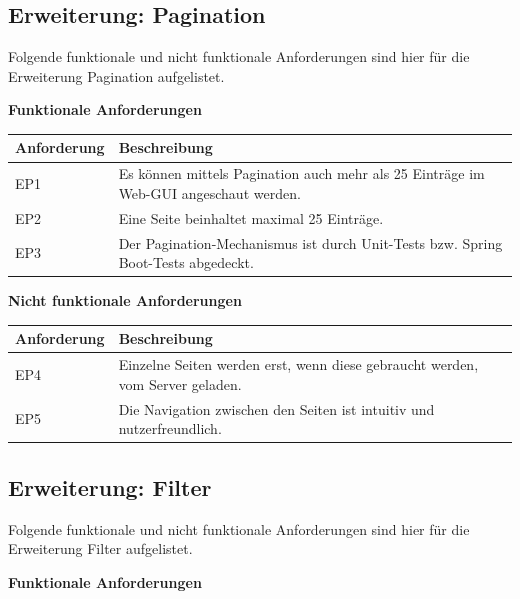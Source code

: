 \subsection{Erweiterung: Pagination}\label{ch:erweiterung-filter}
Folgende funktionale und nicht funktionale Anforderungen sind hier für die Erweiterung Pagination aufgelistet.\newline

\noindent \textbf{Funktionale Anforderungen}\newline

\noindent \begin{tabular}{|p{3cm}|p{12cm}|}
	\hline
	\textbf{Anforderung}  & \textbf{Beschreibung} \\ \hline
	EP1    & Es können mittels Pagination auch mehr als 25 Einträge im Web-GUI angeschaut werden.     \\ \hline
	EP2    & Eine Seite beinhaltet maximal 25 Einträge.     \\ \hline
	EP3    & Der Pagination-Mechanismus ist durch Unit-Tests bzw. Spring Boot-Tests abgedeckt.     \\ \hline
\end{tabular} \newline

\noindent \textbf{Nicht funktionale Anforderungen}\newline

\noindent \begin{tabular}{|p{3cm}|p{12cm}|}
	\hline
	\textbf{Anforderung}  & \textbf{Beschreibung} \\ \hline
	EP4    & Einzelne Seiten werden erst, wenn diese gebraucht werden, vom Server geladen.     \\ \hline
	EP5    & Die Navigation zwischen den Seiten ist intuitiv und nutzerfreundlich.     \\ \hline
\end{tabular}

\subsection{Erweiterung: Filter}
Folgende funktionale und nicht funktionale Anforderungen sind hier für die Erweiterung Filter aufgelistet.\newline

\noindent \textbf{Funktionale Anforderungen}\newline

